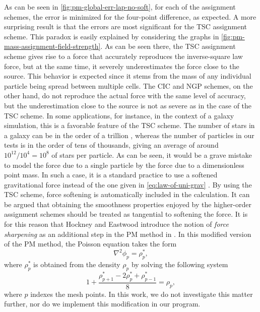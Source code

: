 As can be seen in \autoref{fig:pm-global-err-lap-no-soft}, for each of the assignment schemes, the error is minimized for the four-point difference, as expected.
A more surprising result is that the errors are most significant for the TSC assignment scheme.
This paradox is easily explained by considering the graphs in \autoref{fig:pm-mass-assignment-field-strength}.
As can be seen there, the TSC assignment scheme gives rise to a force that accurately reproduces the inverse-square law force, but at the same time, it severely underestimates the force close to the source.
This behavior is expected since it stems from the mass of any individual particle being spread between multiple cells.
The CIC and NGP schemes, on the other hand, do not reproduce the actual force with the same level of accuracy, but the underestimation close to the source is not as severe as in the case of the TSC scheme.
In some applications, for instance, in the context of a galaxy simulation, this is a favorable feature of the TSC scheme.
The number of stars in a galaxy can be in the order of a trillion \cite{young2006andromeda}, whereas the number of particles in our tests is in the order of tens of thousands, giving an average of around $10^{12} / 10^{4} = 10^8$ of stars per particle.
As can be seen, it would be a grave mistake to model the force due to a single particle by the force due to a dimensionless point mass.
In such a case, it is a standard practice to use a softened gravitational force instead of the one given in \autoref{eq:law-of-uni-grav} \cite{10.1046/j.1365-8711.2000.03316.x}.
By using the TSC scheme, force softening is automatically included in the calculation.
It can be argued that obtaining the smoothness properties enjoyed by the higher-order assignment schemes should be treated as tangential to softening the force.
It is for this reason that Hockney and Eastwood introduce the notion of \textit{force sharpening} as an additional step in the PM method in \cite{Hockney1988}.
In this modified version of the PM method, the Poisson equation takes the form
\begin{equation*}
    \nabla^2 \phi_p = \rho_p^*,
\end{equation*}
where $\rho^*_p$ is obtained from the density $\rho_p$ by solving the following system
\begin{equation*}
    1+\frac{\rho^*_{p+1} - 2\rho^*_p + \rho^*_{p-1}}{8}
    = \rho_p,
\end{equation*}
where $p$ indexes the mesh points.
In this work, we do not investigate this matter further, nor do we implement this modification in our program.

